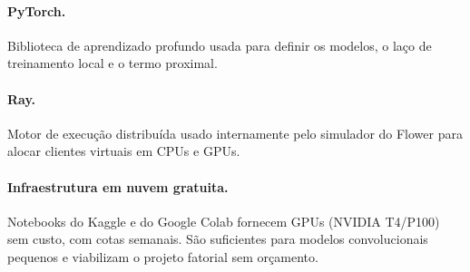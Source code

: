 \paragraph{PyTorch.} Biblioteca de aprendizado profundo \citep{paszke2019pytorch} usada para definir os modelos, o laço de treinamento local e o termo proximal.

\paragraph{Ray.} Motor de execução distribuída \citep{moritz2018ray} usado internamente pelo simulador do Flower para alocar clientes virtuais em CPUs e GPUs.

\paragraph{Infraestrutura em nuvem gratuita.} Notebooks do Kaggle e do Google Colab fornecem GPUs (NVIDIA T4/P100) sem custo, com cotas semanais. São suficientes para modelos convolucionais pequenos e viabilizam o projeto fatorial sem orçamento.
